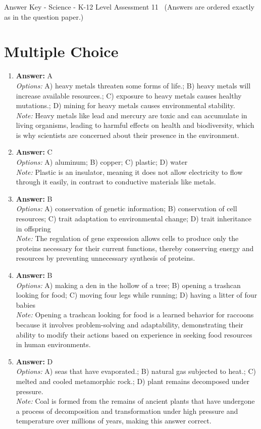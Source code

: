 \documentclass[12pt]{article}
\begin{document}
\begin{center}
Answer Key - Science - K-12 Level Assessment 11 \
\small (Answers are ordered exactly as in the question paper.)
\end{center}

\section*{Multiple Choice}
\begin{enumerate}[label=\arabic*.]
\item \textbf{Answer:} A
\\ \textit{Options:} A) heavy metals threaten some forms of life.; B) heavy metals will increase available resources.; C) exposure to heavy metals causes healthy mutations.; D) mining for heavy metals causes environmental stability.
\\ \textit{Note:} Heavy metals like lead and mercury are toxic and can accumulate in living organisms, leading to harmful effects on health and biodiversity, which is why scientists are concerned about their presence in the environment.
\item \textbf{Answer:} C
\\ \textit{Options:} A) aluminum; B) copper; C) plastic; D) water
\\ \textit{Note:} Plastic is an insulator, meaning it does not allow electricity to flow through it easily, in contrast to conductive materials like metals.
\item \textbf{Answer:} B
\\ \textit{Options:} A) conservation of genetic information; B) conservation of cell resources; C) trait adaptation to environmental change; D) trait inheritance in offspring
\\ \textit{Note:} The regulation of gene expression allows cells to produce only the proteins necessary for their current functions, thereby conserving energy and resources by preventing unnecessary synthesis of proteins.
\item \textbf{Answer:} B
\\ \textit{Options:} A) making a den in the hollow of a tree; B) opening a trashcan looking for food; C) moving four legs while running; D) having a litter of four babies
\\ \textit{Note:} Opening a trashcan looking for food is a learned behavior for raccoons because it involves problem-solving and adaptability, demonstrating their ability to modify their actions based on experience in seeking food resources in human environments.
\item \textbf{Answer:} D
\\ \textit{Options:} A) seas that have evaporated.; B) natural gas subjected to heat.; C) melted and cooled metamorphic rock.; D) plant remains decomposed under pressure.
\\ \textit{Note:} Coal is formed from the remains of ancient plants that have undergone a process of decomposition and transformation under high pressure and temperature over millions of years, making this answer correct.
\end{enumerate}
\end{document}
